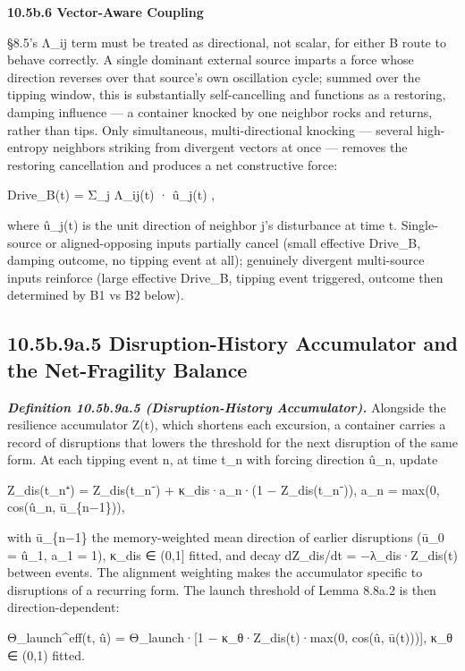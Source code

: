 \documentclass[
]{article}
\begin{document}
\textbf{10.5b.6 Vector-Aware Coupling}

§8.5's Λ\_ij term must be treated as directional, not scalar, for either
B route to behave correctly. A single dominant external source imparts a
force whose direction reverses over that source's own oscillation cycle;
summed over the tipping window, this is substantially self-cancelling
and functions as a restoring, damping influence --- a container knocked
by one neighbor rocks and returns, rather than tips. Only simultaneous,
multi-directional knocking --- several high-entropy neighbors striking
from divergent vectors at once --- removes the restoring cancellation
and produces a net constructive force:

Drive\_B(t) = Σ\_j Λ\_ij(t) · û\_j(t) ,

where û\_j(t) is the unit direction of neighbor j's disturbance at time
t. Single-source or aligned-opposing inputs partially cancel (small
effective Drive\_B, damping outcome, no tipping event at all); genuinely
divergent multi-source inputs reinforce (large effective Drive\_B,
tipping event triggered, outcome then determined by B1 vs B2 below).

\hypertarget{b.9a.5-disruption-history-accumulator-and-the-net-fragility-balance}{%
\subsection{10.5b.9a.5 Disruption-History Accumulator and the
Net-Fragility
Balance}\label{b.9a.5-disruption-history-accumulator-and-the-net-fragility-balance}}

\emph{\textbf{Definition 10.5b.9a.5 (Disruption-History Accumulator).}}
Alongside the resilience accumulator Z(t), which shortens each
excursion, a container carries a record of disruptions that lowers the
threshold for the next disruption of the same form. At each tipping
event n, at time t\_n with forcing direction û\_n, update

Z\_dis(t\_n⁺) = Z\_dis(t\_n⁻) + κ\_dis·a\_n·(1 − Z\_dis(t\_n⁻)), a\_n =
max(0, cos(û\_n, ū\_\{n−1\})),

with ū\_\{n−1\} the memory-weighted mean direction of earlier
disruptions (ū\_0 = û\_1, a\_1 = 1), κ\_dis ∈ (0,1{]} fitted, and decay
dZ\_dis/dt = −λ\_dis·Z\_dis(t) between events. The alignment weighting
makes the accumulator specific to disruptions of a recurring form. The
launch threshold of Lemma 8.8a.2 is then direction-dependent:

Θ\_launch\^{}eff(t, û) = Θ\_launch·{[}1 − κ\_θ·Z\_dis(t)·max(0, cos(û,
ū(t))){]}, κ\_θ ∈ (0,1) fitted.
\end{document}

